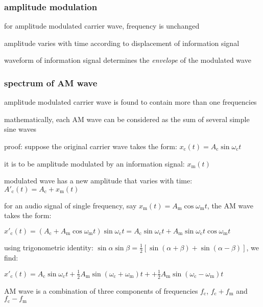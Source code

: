 \subsubsection{amplitude modulation}

for amplitude modulated carrier wave, frequency is unchanged

amplitude varies with time according to displacement of information signal

waveform of information signal determines the \emph{envelope} of the modulated wave

\subsubsection*{spectrum of AM wave}

amplitude modulated carrier wave is found to contain more than one frequencies

mathematically, each AM wave can be considered as the sum of several simple sine waves

\noindent proof: suppose the original carrier wave takes the form: $x_\text{c}(t) = A_\text{c} \sin \omega_\text{c} t$

it is to be amplitude modulated by an information signal: $x_\text{m}(t)$

modulated wave has a new amplitude that varies with time: $A'_\text{c}(t) = A_\text{c} + x_\text{m}(t)$


for an audio signal of single frequency, say $x_\text{m}(t) = A_\text{m} \cos \omega_\text{m} t$, the AM wave takes the form:

{
	\centering
	
	$x'_\text{c}(t) = (A_\text{c} + A_\text{m} \cos \omega_\text{m} t)\sin \omega_\text{c} t = A_\text{c} \sin \omega_\text{c} t + A_\text{m} \sin \omega_\text{c} t \cos \omega_\text{m} t$
	
}

using trigonometric identity: $\sin\alpha\sin\beta = \frac{1}{2}\left[ \sin(\alpha + \beta) + \sin(\alpha - \beta) \right]$, we find:

{
	\centering
	
	$x'_\text{c}(t) = A_\text{c} \sin\omega_\text{c} t + \frac{1}{2}A_\text{m} \sin(\omega_\text{c}+\omega_\text{m})t + + \frac{1}{2}A_\text{m} \sin(\omega_\text{c}-\omega_\text{m})t$
	
}

AM wave is a combination of three components of frequencies $f_\text{c}$, $f_\text{c} + f_\text{m}$ and $f_\text{c} - f_\text{m}$ \eoe

